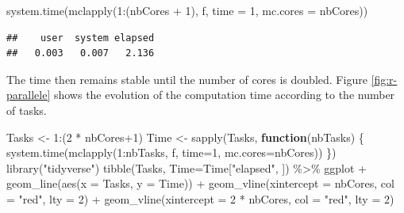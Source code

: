 \documentclass[
  12pt,
  american,
  a4paper,
  extrafontsizes,onecolumn,openright
  ]{memoir}
\newenvironment{Shaded}{\begin{snugshade}}{\end{snugshade}}
\newcommand{\AttributeTok}[1]{\textcolor[rgb]{0.77,0.63,0.00}{#1}}
\newcommand{\ControlFlowTok}[1]{\textcolor[rgb]{0.13,0.29,0.53}{\textbf{#1}}}
\newcommand{\DecValTok}[1]{\textcolor[rgb]{0.00,0.00,0.81}{#1}}
\newcommand{\FunctionTok}[1]{\textcolor[rgb]{0.00,0.00,0.00}{#1}}
\newcommand{\NormalTok}[1]{#1}
\newcommand{\OtherTok}[1]{\textcolor[rgb]{0.56,0.35,0.01}{#1}}
\newcommand{\SpecialCharTok}[1]{\textcolor[rgb]{0.00,0.00,0.00}{#1}}
\newcommand{\StringTok}[1]{\textcolor[rgb]{0.31,0.60,0.02}{#1}}
\begin{document}
\begin{Shaded}
\begin{Highlighting}[]
\FunctionTok{system.time}\NormalTok{(}\FunctionTok{mclapply}\NormalTok{(}\DecValTok{1}\SpecialCharTok{:}\NormalTok{(nbCores }\SpecialCharTok{+} \DecValTok{1}\NormalTok{), f, }\AttributeTok{time =} \DecValTok{1}\NormalTok{, }\AttributeTok{mc.cores =}\NormalTok{ nbCores))}
\end{Highlighting}
\end{Shaded}

\begin{verbatim}
##    user  system elapsed 
##   0.003   0.007   2.136
\end{verbatim}

\normalsize

The time then remains stable until the number of cores is doubled.
Figure \ref{fig:r-parallele} shows the evolution of the computation time according to the number of tasks.



\scriptsize

\begin{Shaded}
\begin{Highlighting}[]
\NormalTok{Tasks }\OtherTok{\textless{}{-}} \DecValTok{1}\SpecialCharTok{:}\NormalTok{(}\DecValTok{2} \SpecialCharTok{*}\NormalTok{ nbCores}\SpecialCharTok{+}\DecValTok{1}\NormalTok{)}
\NormalTok{Time }\OtherTok{\textless{}{-}} \FunctionTok{sapply}\NormalTok{(Tasks, }\ControlFlowTok{function}\NormalTok{(nbTasks) \{}
      \FunctionTok{system.time}\NormalTok{(}\FunctionTok{mclapply}\NormalTok{(}\DecValTok{1}\SpecialCharTok{:}\NormalTok{nbTasks, f, }\AttributeTok{time=}\DecValTok{1}\NormalTok{, }\AttributeTok{mc.cores=}\NormalTok{nbCores))}
\NormalTok{              \})}
\FunctionTok{library}\NormalTok{(}\StringTok{"tidyverse"}\NormalTok{)}
\FunctionTok{tibble}\NormalTok{(Tasks, }\AttributeTok{Time=}\NormalTok{Time[}\StringTok{"elapsed"}\NormalTok{, ]) }\SpecialCharTok{\%\textgreater{}\%} 
\NormalTok{  ggplot }\SpecialCharTok{+}
  \FunctionTok{geom\_line}\NormalTok{(}\FunctionTok{aes}\NormalTok{(}\AttributeTok{x =}\NormalTok{ Tasks, }\AttributeTok{y =}\NormalTok{ Time)) }\SpecialCharTok{+}
  \FunctionTok{geom\_vline}\NormalTok{(}\AttributeTok{xintercept =}\NormalTok{ nbCores, }\AttributeTok{col =} \StringTok{"red"}\NormalTok{, }\AttributeTok{lty =} \DecValTok{2}\NormalTok{) }\SpecialCharTok{+}
  \FunctionTok{geom\_vline}\NormalTok{(}\AttributeTok{xintercept =} \DecValTok{2} \SpecialCharTok{*}\NormalTok{ nbCores, }\AttributeTok{col =} \StringTok{"red"}\NormalTok{, }\AttributeTok{lty =} \DecValTok{2}\NormalTok{)}
\end{Highlighting}
\end{Shaded}
\end{document}
